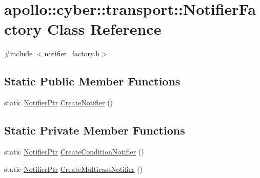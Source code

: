 \hypertarget{classapollo_1_1cyber_1_1transport_1_1NotifierFactory}{\section{apollo\-:\-:cyber\-:\-:transport\-:\-:Notifier\-Factory Class Reference}
\label{classapollo_1_1cyber_1_1transport_1_1NotifierFactory}
}


{\ttfamily \#include $<$notifier\-\_\-factory.\-h$>$}

\subsection*{Static Public Member Functions}
\begin{DoxyCompactItemize}
\item 
static \hyperlink{namespaceapollo_1_1cyber_1_1transport_ad7de1bbf34457c17c4d04b9bbfe152b4}{Notifier\-Ptr} \hyperlink{classapollo_1_1cyber_1_1transport_1_1NotifierFactory_a6399d8f720e458ca14fb4ff36a1cec97}{Create\-Notifier} ()
\end{DoxyCompactItemize}
\subsection*{Static Private Member Functions}
\begin{DoxyCompactItemize}
\item 
static \hyperlink{namespaceapollo_1_1cyber_1_1transport_ad7de1bbf34457c17c4d04b9bbfe152b4}{Notifier\-Ptr} \hyperlink{classapollo_1_1cyber_1_1transport_1_1NotifierFactory_aaa302032c767ab41150af69e7f40d04f}{Create\-Condition\-Notifier} ()
\item 
static \hyperlink{namespaceapollo_1_1cyber_1_1transport_ad7de1bbf34457c17c4d04b9bbfe152b4}{Notifier\-Ptr} \hyperlink{classapollo_1_1cyber_1_1transport_1_1NotifierFactory_a6b8d6a8523cdcbd8120981409301af53}{Create\-Multicast\-Notifier} ()
\end{DoxyCompactItemize}


